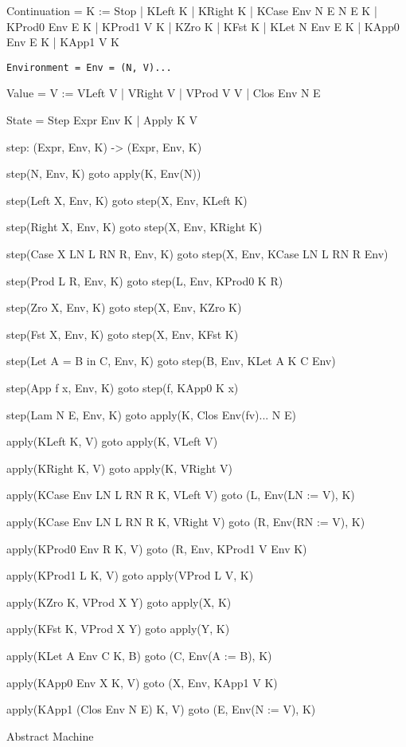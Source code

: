 \documentclass[acmsmall]{acmart}
\begin{document}
	\begin{mdframed}
		Continuation = K := Stop | KLeft K | KRight K | KCase Env N E N E K | KProd0 Env E K | KProd1 V K | KZro K | KFst K | KLet N Env E K | KApp0 Env E K | KApp1 V K
	
		\texttt{Environment = Env = (N, V)...}
		
		Value = V := VLeft V | VRight V | VProd V V | Clos Env N E
		
		State = Step Expr Env K | Apply K V

		step: (Expr, Env, K) -> (Expr, Env, K)

		step(N, Env, K) goto apply(K, Env(N))

		step(Left X, Env, K) goto step(X, Env, KLeft K)
		
		step(Right X, Env, K) goto step(X, Env, KRight K)
		
		step(Case X LN L RN R, Env, K) goto step(X, Env, KCase LN L RN R Env)
		
		step(Prod L R, Env, K) goto step(L, Env, KProd0 K R)
		
		step(Zro X, Env, K) goto step(X, Env, KZro K)
		
		step(Fst X, Env, K) goto step(X, Env, KFst K)
		
		step(Let A = B in C, Env, K) goto step(B, Env, KLet A K C Env)
		
		step(App f x, Env, K) goto step(f, KApp0 K x)
		
		step(Lam N E, Env, K) goto apply(K, Clos Env(fv)... N E)

		apply(KLeft K, V) goto apply(K, VLeft V)

		apply(KRight K, V) goto apply(K, VRight V)
		
		apply(KCase Env LN L RN R K, VLeft V) goto (L, Env(LN := V), K)

		apply(KCase Env LN L RN R K, VRight V) goto (R, Env(RN := V), K)
		
		apply(KProd0 Env R K, V) goto (R, Env, KProd1 V Env K)
		
		apply(KProd1 L K, V) goto apply(VProd L V, K)
		
		apply(KZro K, VProd X Y) goto apply(X, K)

		apply(KFst K, VProd X Y) goto apply(Y, K)
		
		apply(KLet A Env C K, B) goto (C, Env(A := B), K)
		
		apply(KApp0 Env X K, V) goto (X, Env, KApp1 V K)
		
		apply(KApp1 (Clos Env N E) K, V) goto (E, Env(N := V), K)

		Abstract Machine
	\end{mdframed}
\end{document}
